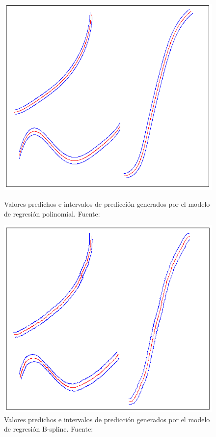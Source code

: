\begin{anexos}
\begin{figure}[H]
		\centering
	\begin{minipage}{0.48\linewidth}  %
		\centering
		\includegraphics[width=0.9\linewidth]{polinomial.png} %
		\caption{Valores predichos e intervalos de predicción generados por el modelo de regresión polinomial. Fuente: \cite{lin2009free}}
		\label{free-form-draw-polinomial}
	\end{minipage}%
	\hfill
	\begin{minipage}{0.48\linewidth} %
		\centering
		\includegraphics[width=0.9\linewidth]{b-spline.png} %
		\caption{Valores predichos e intervalos de predicción generados por el modelo de regresión B-spline. Fuente: \cite{lin2009free}}
		\label{free-form-draw-spline}
	\end{minipage}
	

\end{figure}
\end{anexos}
